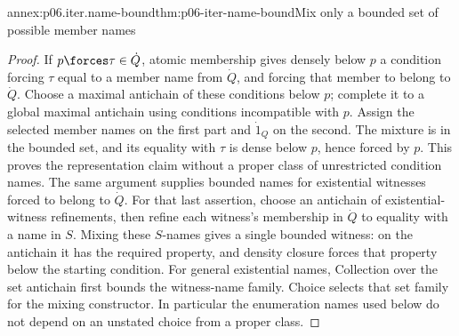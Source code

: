 \begin{annexitem}{annex:p06.iter.name-bound}{thm:p06-iter-name-bound}{Mix only a bounded set of possible member names}
\begin{proof}
If \(p\forces\tau\in\dot Q\), atomic membership gives densely below
\(p\) a condition forcing \(\tau\) equal to a member name from
\(\dot Q\), and forcing that member to belong to \(\dot Q\).
Choose a maximal antichain of these conditions below \(p\); complete
it to a global maximal antichain using conditions incompatible with
\(p\). Assign the selected member names on the first part and
\(\dot1_Q\) on the second. The mixture is in the bounded set, and
its equality with \(\tau\) is dense below \(p\), hence forced by
\(p\). This proves the representation claim without a proper class
of unrestricted condition names. The same argument supplies bounded
names for existential witnesses forced to belong to \(\dot Q\).
For that last assertion, choose an antichain of existential-witness
refinements, then refine each witness's membership in \(\dot Q\) to
equality with a name in \(S\). Mixing these \(S\)-names gives a
single bounded witness: on the antichain it has the required property,
and density closure forces that property below the starting condition.
For general existential names, Collection over the set antichain first
bounds the witness-name family. Choice selects that set family for the
mixing constructor. In particular the enumeration names used below do
not depend on an unstated choice from a proper class.
\end{proof}
\end{annexitem}

